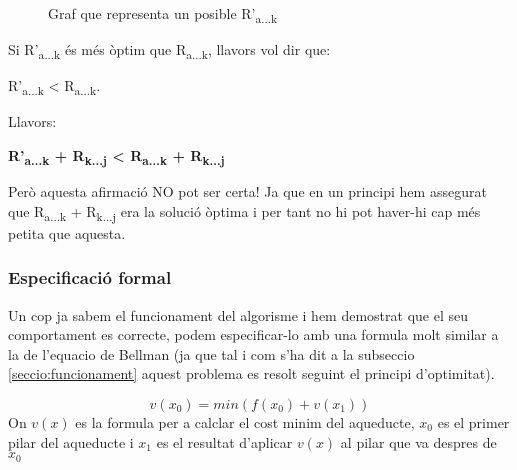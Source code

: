 \documentclass[12pt, letterpaper]{article}
\begin{document}
\begin{figure}[htbp]
\begin{center}
\caption{Graf que representa un posible R'\textsubscript{a...k}}
\label{demostracio:atoktojhypotetical}
\end{center}
\end{figure}

Si R'\textsubscript{a...k} és més òptim que R\textsubscript{a...k}, llavors vol dir que: \\
\begin{center}
R'\textsubscript{a...k} < R\textsubscript{a...k}.\\
\end{center}
Llavors:\\
\begin{center}
\textbf{R'\textsubscript{a...k} + R\textsubscript{k...j} < R\textsubscript{a...k} + R\textsubscript{k...j}} \\
\end{center}

Però aquesta afirmació NO pot ser certa! Ja que en un principi hem assegurat que R\textsubscript{a...k} + R\textsubscript{k...j} era la solució òptima i per tant no hi pot haver-hi cap més petita que aquesta.


\subsubsection{Especificació formal}
Un cop ja sabem el funcionament del algorisme i hem demostrat que el seu comportament es correcte, podem especificar-lo amb una formula molt similar a la de l'equacio de Bellman (ja que tal i com s'ha dit a la subseccio \ref{seccio:funcionament} aquest problema es resolt seguint el principi d'optimitat).

\begin{center}
\begin{equation}
v(x_{0}) = min(f(x_{0}) + v(x_{1}))
\end{equation}
On $v(x)$ es la formula per a calclar el cost minim del aqueducte, $x_{0}$ es el primer pilar del aqueducte i $x_{1}$ es el resultat d'aplicar $v(x)$ al pilar que va despres de $x_{0}$
\end{center}
\end{document}
